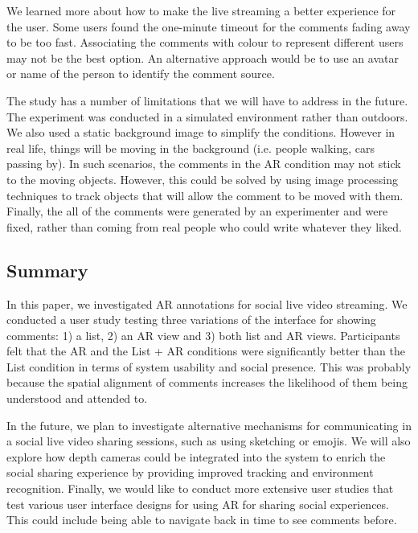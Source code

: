 We learned more about how to make the live streaming a better experience for the user. Some users found the one-minute timeout for the comments fading away to be too fast. Associating the comments with colour to represent different users may not be the best option. An alternative approach would be to use an avatar or name of the person to identify the comment source. 

The study has a number of limitations that we will have to address in the future. The experiment was conducted in a simulated environment rather than outdoors. We also used a static background image to simplify the conditions. However in real life, things will be moving in the background (i.e. people walking, cars passing by). In such scenarios, the comments in the AR condition may not stick to the moving objects. However, this could be solved by using image processing techniques to track objects that will allow the comment to be moved with them. Finally, the all of the comments were generated by an experimenter and were fixed, rather than coming from real people who could write whatever they liked.    

\subsection{Summary}

In this paper, we investigated AR annotations for social live video streaming. We conducted a user study testing three variations of the interface for showing comments: 1) a list, 2) an AR view and 3) both list and AR views. Participants felt that the AR and the List + AR conditions were significantly better than the List condition in terms of system usability and social presence. This was probably because the spatial alignment of comments increases the likelihood of them being understood and attended to.

In the future, we plan to investigate alternative mechanisms for communicating in a social live video sharing sessions, such as using sketching or emojis. We will also explore how depth cameras could be integrated into the system to enrich the social sharing experience by providing improved tracking and environment recognition. Finally, we would like to conduct more extensive user studies that test various user interface designs for using AR for sharing social experiences. This could include being able to navigate back in time to see comments before. 
